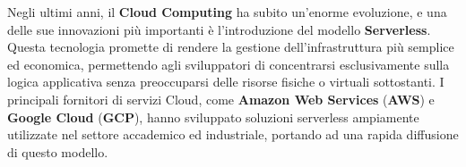 Negli ultimi anni, il \textbf{Cloud Computing} ha subito un'enorme evoluzione, e una delle sue innovazioni più importanti è l’introduzione del modello \textbf{Serverless}. Questa tecnologia promette di rendere la gestione dell'infrastruttura più semplice ed economica, permettendo agli sviluppatori di concentrarsi esclusivamente sulla logica applicativa senza preoccuparsi delle risorse fisiche o virtuali sottostanti. I principali fornitori di servizi Cloud, come \textbf{Amazon Web Services} (\textbf{AWS}) e \textbf{Google Cloud} (\textbf{GCP}), hanno sviluppato soluzioni serverless ampiamente utilizzate nel settore accademico ed industriale, portando ad una rapida diffusione di questo modello.